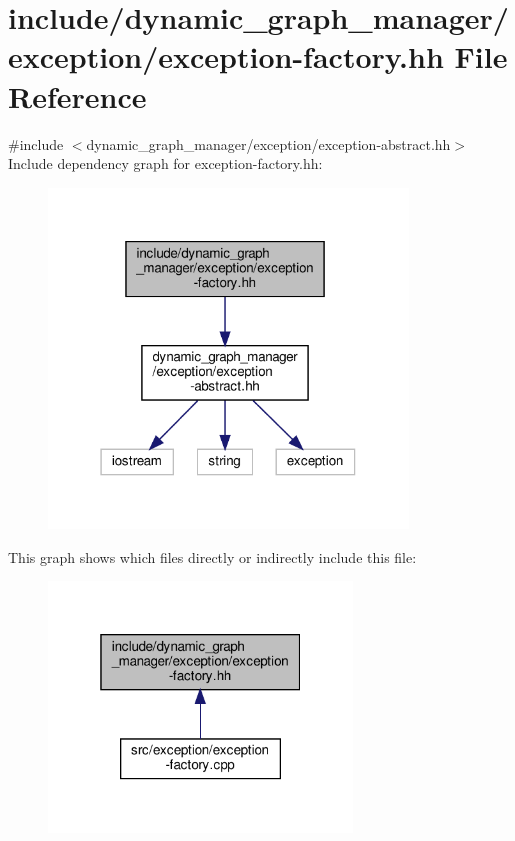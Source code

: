 \hypertarget{exception-factory_8hh}{}\section{include/dynamic\+\_\+graph\+\_\+manager/exception/exception-\/factory.hh File Reference}
\label{exception-factory_8hh}
{\ttfamily \#include $<$dynamic\+\_\+graph\+\_\+manager/exception/exception-\/abstract.\+hh$>$}\newline
Include dependency graph for exception-\/factory.hh\+:
\nopagebreak
\begin{figure}[H]
\begin{center}
\leavevmode
\includegraphics[width=271pt]{exception-factory_8hh__incl}
\end{center}
\end{figure}
This graph shows which files directly or indirectly include this file\+:
\nopagebreak
\begin{figure}[H]
\begin{center}
\leavevmode
\includegraphics[width=229pt]{exception-factory_8hh__dep__incl}
\end{center}
\end{figure}
